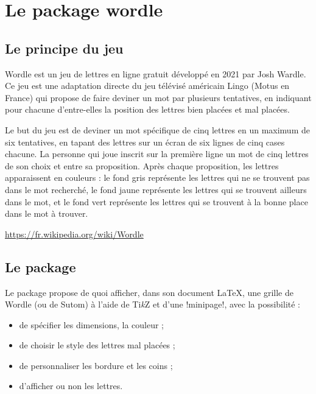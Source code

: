 \documentclass[french,a4paper,11pt]{article}
\providecommand\tikzlogo{Ti\textit{k}Z}
\let\TikZ\tikzlogo
\begin{document}
{\section{Le package wordle}

\subsection{Le principe du jeu}

\begin{noteblock}
Wordle est un jeu de lettres en ligne gratuit développé en 2021 par Josh Wardle. Ce jeu est une adaptation directe du jeu télévisé américain Lingo (Motus en France) qui propose de faire deviner un mot par plusieurs tentatives, en indiquant pour chacune d'entre-elles la position des lettres bien placées et mal placées.

Le but du jeu est de deviner un mot spécifique de cinq lettres en un maximum de six tentatives, en tapant des lettres sur un écran de six lignes de cinq cases chacune. La personne qui joue inscrit sur la première ligne un mot de cinq lettres de son choix et entre sa proposition. Après chaque proposition, les lettres apparaissent en couleurs : le fond gris représente les lettres qui ne se trouvent pas dans le mot recherché, le fond jaune représente les lettres qui se trouvent ailleurs dans le mot, et le fond vert représente les lettres qui se trouvent à la bonne place dans le mot à trouver.

\smallskip

\hfill{\scriptsize \url{https://fr.wikipedia.org/wiki/Wordle}}
\end{noteblock}

\subsection{Le package}

\begin{noteblock}
Le package propose de quoi afficher, dans son document \LaTeX, une grille de Wordle (ou de Sutom) à l'aide de \TikZ{} et d'une \motcletex!minipage!, avec la possibilité :

\begin{itemize}
	\item de spécifier les dimensions, la couleur ;
	\item de choisir le style des lettres mal placées ;
	\item de personnaliser les bordure et les coins ;
	\item d'afficher ou non les lettres.
\end{itemize}


\end{noteblock}}
\end{document}
